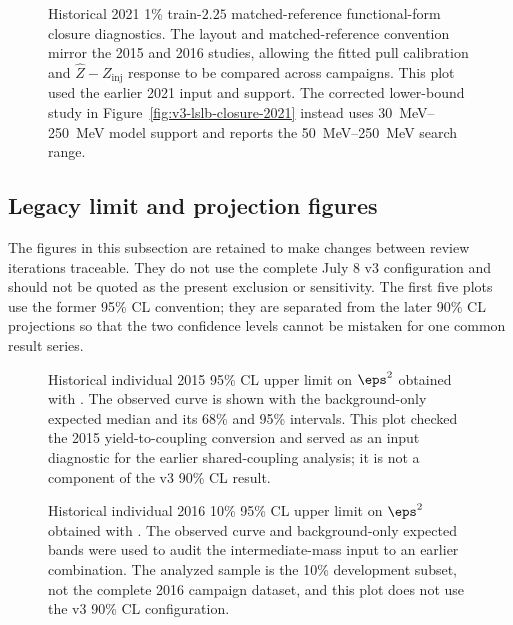 \begin{figure}[p]
\centering
{}

\vspace{0.35em}

\caption{Historical 2021 1\% train-$2.25$ matched-reference functional-form closure
diagnostics. The layout and matched-reference convention mirror the 2015 and 2016
studies, allowing the fitted pull calibration and $\hat Z-Z_{\mathrm{inj}}$ response
to be compared across campaigns. This plot used the earlier 2021 input and support.
The corrected lower-bound study in Figure~\ref{fig:v3-lslb-closure-2021} instead uses
\SIrange{30}{250}{MeV} model support and reports the
\SIrange{50}{250}{MeV} search range.}
\label{fig:refmatched-train225-closure-2021}
\end{figure}

\FloatBarrier

\subsection{Legacy limit and projection figures}

The figures in this subsection are retained to make changes between review iterations
traceable. They do not use the complete July 8 v3 configuration and should not be
quoted as the present exclusion or sensitivity. The first five plots use the former
95\% CL convention; they are separated from the later 90\% CL projections so that the
two confidence levels cannot be mistaken for one common result series.

\begin{figure}[p]
\centering
{}
\caption{Historical individual 2015 95\% CL upper limit on $\eps^2$ obtained with
\CLs{}. The observed curve is shown with the background-only expected median and its
68\% and 95\% intervals. This plot checked the 2015 yield-to-coupling conversion and
served as an input diagnostic for the earlier shared-coupling analysis; it is not a
component of the v3 90\% CL result.}
\label{fig:app-legacy-95-individuals}
\end{figure}

\begin{figure}[p]
\centering
{}
\caption{Historical individual 2016 10\% 95\% CL upper limit on $\eps^2$ obtained
with \CLs{}. The observed curve and background-only expected bands were used to audit
the intermediate-mass input to an earlier combination. The analyzed sample is the
10\% development subset, not the complete 2016 campaign dataset, and this plot does
not use the v3 90\% CL configuration.}
\label{fig:app-legacy-95-individual-2016}
\end{figure}

